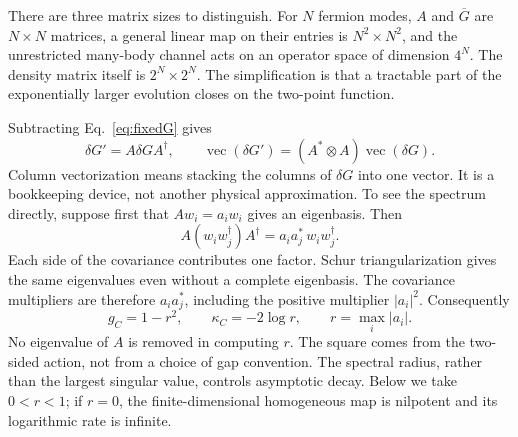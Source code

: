 \documentclass[aps,prb,onecolumn,nofootinbib,superscriptaddress,floatfix]{revtex4-2}
\begin{document}
There are three matrix sizes to distinguish. For $N$ fermion modes,
$A$ and $\overline G$ are $N\times N$ matrices, a general linear map
on their entries is $N^2\times N^2$, and the unrestricted many-body
channel acts on an operator space of dimension $4^N$.
The density matrix itself is $2^N\times2^N$. The simplification
is that a tractable part of the exponentially larger evolution
closes on the two-point function.

Subtracting Eq.~\eqref{eq:fixedG} gives
\begin{equation}
 \delta G'=A\delta GA^\dagger,\qquad
 \operatorname{vec}(\delta G')=(A^*\otimes A)
                                      \operatorname{vec}(\delta G).
 \label{eq:vec}
\end{equation}
Column vectorization means stacking the columns of $\delta G$ into
one vector. It is a bookkeeping device, not another physical
approximation. To see the spectrum directly, suppose first that
$Aw_i=a_iw_i$ gives an eigenbasis. Then
\begin{equation}
 A(w_iw_j^\dagger)A^\dagger
     =a_i a_j^*\,w_iw_j^\dagger.
 \label{eq:pairwise_action}
\end{equation}
Each side of the covariance contributes one factor. Schur
triangularization gives the same eigenvalues even without a
complete eigenbasis. The covariance multipliers are therefore
$a_i a_j^*$, including the positive multiplier $|a_i|^2$.
Consequently
\begin{equation}
 g_C=1-r^2,\qquad \kappa_C=-2\log r,\qquad r=\max_i|a_i|.
 \label{eq:covgap}
\end{equation}
No eigenvalue of $A$ is removed in computing $r$. The square comes
from the two-sided action, not from a choice of gap convention.
The spectral radius, rather than the largest singular value, controls
asymptotic decay. Below we take $0<r<1$; if $r=0$, the finite-dimensional
homogeneous map is nilpotent and its logarithmic rate is infinite.
\end{document}
